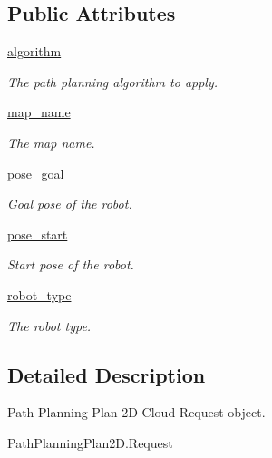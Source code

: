 \subsection*{Public Attributes}
\begin{DoxyCompactItemize}
\item 
\hyperlink{classRappCloud_1_1CloudMsgs_1_1PathPlanningPlan2D_1_1PathPlanningPlan2D_1_1Request_a3838f21edde6fb8c64862c12c56492d0}{algorithm}
\begin{DoxyCompactList}\small\item\em The path planning algorithm to apply. \end{DoxyCompactList}\item 
\hyperlink{classRappCloud_1_1CloudMsgs_1_1PathPlanningPlan2D_1_1PathPlanningPlan2D_1_1Request_a4a836991dcf02705a31ab9eea828a085}{map\-\_\-name}
\begin{DoxyCompactList}\small\item\em The map name. \end{DoxyCompactList}\item 
\hyperlink{classRappCloud_1_1CloudMsgs_1_1PathPlanningPlan2D_1_1PathPlanningPlan2D_1_1Request_aefcafbf0fd37a50d03268c15c81c347f}{pose\-\_\-goal}
\begin{DoxyCompactList}\small\item\em Goal pose of the robot. \end{DoxyCompactList}\item 
\hyperlink{classRappCloud_1_1CloudMsgs_1_1PathPlanningPlan2D_1_1PathPlanningPlan2D_1_1Request_ab2bb382eea63259ff70133b1e978078a}{pose\-\_\-start}
\begin{DoxyCompactList}\small\item\em Start pose of the robot. \end{DoxyCompactList}\item 
\hyperlink{classRappCloud_1_1CloudMsgs_1_1PathPlanningPlan2D_1_1PathPlanningPlan2D_1_1Request_aa0e9be23584480be391095c1c64a560c}{robot\-\_\-type}
\begin{DoxyCompactList}\small\item\em The robot type. \end{DoxyCompactList}\end{DoxyCompactItemize}


\subsection{Detailed Description}
\begin{DoxyVerb}Path Planning Plan 2D Cloud Request object.

PathPlanningPlan2D.Request
\end{DoxyVerb}
 

